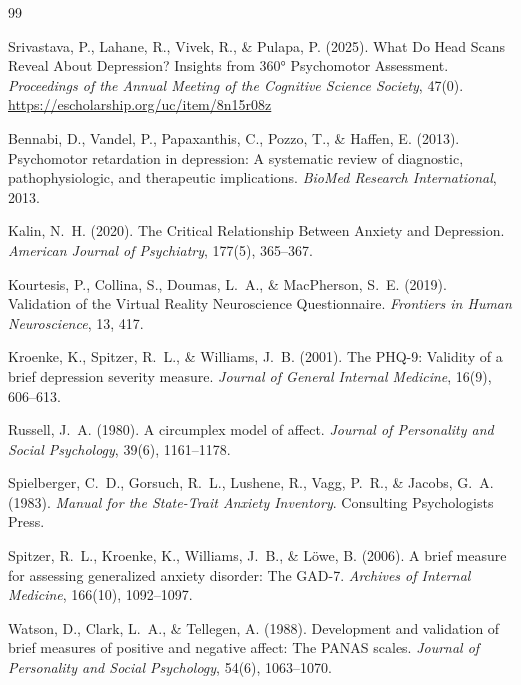 \documentclass[12pt]{article}
\begin{document}
\begin{thebibliography}{99}

Srivastava, P., Lahane, R., Vivek, R., \& Pulapa, P. (2025).
What Do Head Scans Reveal About Depression? Insights from 360° Psychomotor Assessment.
\textit{Proceedings of the Annual Meeting of the Cognitive Science Society}, 47(0).
\url{https://escholarship.org/uc/item/8n15r08z}

Bennabi, D., Vandel, P., Papaxanthis, C., Pozzo, T., \& Haffen, E. (2013).
Psychomotor retardation in depression: A systematic review of diagnostic, pathophysiologic, and therapeutic implications.
\textit{BioMed Research International}, 2013.

Kalin, N.~H. (2020).
The Critical Relationship Between Anxiety and Depression.
\textit{American Journal of Psychiatry}, 177(5), 365--367.

Kourtesis, P., Collina, S., Doumas, L.~A., \& MacPherson, S.~E. (2019).
Validation of the Virtual Reality Neuroscience Questionnaire.
\textit{Frontiers in Human Neuroscience}, 13, 417.

Kroenke, K., Spitzer, R.~L., \& Williams, J.~B. (2001).
The PHQ-9: Validity of a brief depression severity measure.
\textit{Journal of General Internal Medicine}, 16(9), 606--613.

Russell, J.~A. (1980).
A circumplex model of affect.
\textit{Journal of Personality and Social Psychology}, 39(6), 1161--1178.

Spielberger, C.~D., Gorsuch, R.~L., Lushene, R., Vagg, P.~R., \& Jacobs, G.~A. (1983).
\textit{Manual for the State-Trait Anxiety Inventory}. Consulting Psychologists Press.

Spitzer, R.~L., Kroenke, K., Williams, J.~B., \& L\"{o}we, B. (2006).
A brief measure for assessing generalized anxiety disorder: The GAD-7.
\textit{Archives of Internal Medicine}, 166(10), 1092--1097.

Watson, D., Clark, L.~A., \& Tellegen, A. (1988).
Development and validation of brief measures of positive and negative affect: The PANAS scales.
\textit{Journal of Personality and Social Psychology}, 54(6), 1063--1070.

\end{thebibliography}
\end{document}
